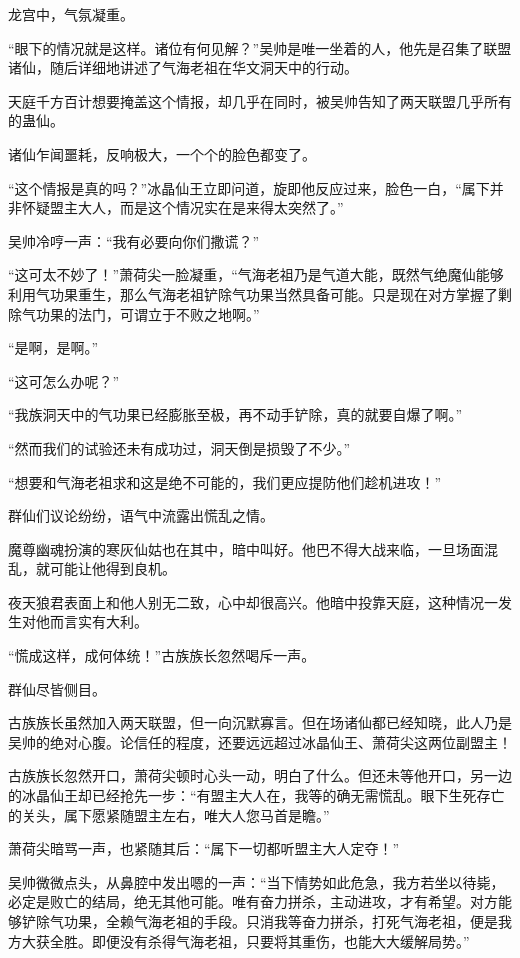 
\begin{this_body}

龙宫中，气氛凝重。

“眼下的情况就是这样。诸位有何见解？”吴帅是唯一坐着的人，他先是召集了联盟诸仙，随后详细地讲述了气海老祖在华文洞天中的行动。

天庭千方百计想要掩盖这个情报，却几乎在同时，被吴帅告知了两天联盟几乎所有的蛊仙。

诸仙乍闻噩耗，反响极大，一个个的脸色都变了。

“这个情报是真的吗？”冰晶仙王立即问道，旋即他反应过来，脸色一白，“属下并非怀疑盟主大人，而是这个情况实在是来得太突然了。”

吴帅冷哼一声：“我有必要向你们撒谎？”

“这可太不妙了！”萧荷尖一脸凝重，“气海老祖乃是气道大能，既然气绝魔仙能够利用气功果重生，那么气海老祖铲除气功果当然具备可能。只是现在对方掌握了剿除气功果的法门，可谓立于不败之地啊。”

“是啊，是啊。”

“这可怎么办呢？”

“我族洞天中的气功果已经膨胀至极，再不动手铲除，真的就要自爆了啊。”

“然而我们的试验还未有成功过，洞天倒是损毁了不少。”

“想要和气海老祖求和这是绝不可能的，我们更应提防他们趁机进攻！”

群仙们议论纷纷，语气中流露出慌乱之情。

魔尊幽魂扮演的寒灰仙姑也在其中，暗中叫好。他巴不得大战来临，一旦场面混乱，就可能让他得到良机。

夜天狼君表面上和他人别无二致，心中却很高兴。他暗中投靠天庭，这种情况一发生对他而言实有大利。

“慌成这样，成何体统！”古族族长忽然喝斥一声。

群仙尽皆侧目。

古族族长虽然加入两天联盟，但一向沉默寡言。但在场诸仙都已经知晓，此人乃是吴帅的绝对心腹。论信任的程度，还要远远超过冰晶仙王、萧荷尖这两位副盟主！

古族族长忽然开口，萧荷尖顿时心头一动，明白了什么。但还未等他开口，另一边的冰晶仙王却已经抢先一步：“有盟主大人在，我等的确无需慌乱。眼下生死存亡的关头，属下愿紧随盟主左右，唯大人您马首是瞻。”

萧荷尖暗骂一声，也紧随其后：“属下一切都听盟主大人定夺！”

吴帅微微点头，从鼻腔中发出嗯的一声：“当下情势如此危急，我方若坐以待毙，必定是败亡的结局，绝无其他可能。唯有奋力拼杀，主动进攻，才有希望。对方能够铲除气功果，全赖气海老祖的手段。只消我等奋力拼杀，打死气海老祖，便是我方大获全胜。即便没有杀得气海老祖，只要将其重伤，也能大大缓解局势。”


\end{this_body}
